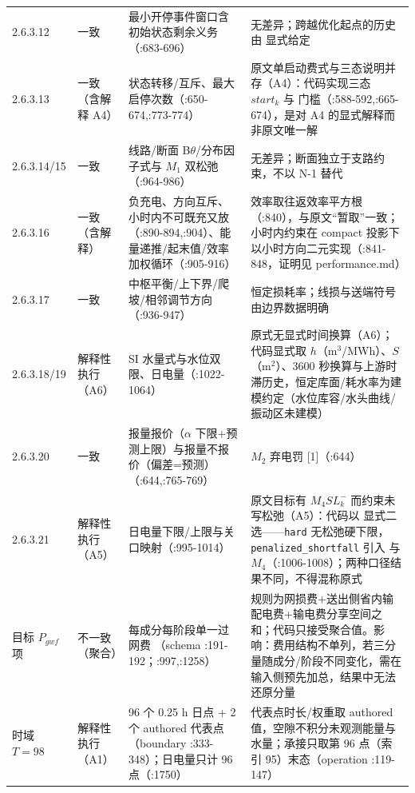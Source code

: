 \begin{center}
\begin{longtable}{@{}L{1.7cm}L{2.2cm}L{4.6cm}L{6.6cm}@{}}
2.6.3.12 & 一致 & 最小开停事件窗口含初始状态剩余义务（:683-696） & 无差异；跨越优化起点的历史由  显式给定\\
2.6.3.13 & 一致（含解释 A4） & 状态转移/互斥、最大启停次数（:650-674,:773-774） & 原文单启动费式与三态说明并存（A4）：代码实现三态 $start_k$ 与  门槛（:588-592,:665-674），是对 A4 的显式解释而非原文唯一解\\
2.6.3.14/15 & 一致 & 线路/断面 B$\theta$/分布因子式与 $M_1$ 双松弛（:964-986） & 无差异；断面独立于支路约束，不以 N-1 替代\\
2.6.3.16 & 一致（含解释） & 负充电、方向互斥、小时内不可既充又放（:890-894,:904）、能量递推/起末值/效率加权循环（:905-916） & 效率取往返效率平方根（:840），与原文“暂取”一致；小时内约束在 compact 投影下以小时方向二元实现（:841-848，证明见 performance.md）\\
2.6.3.17 & 一致 & 中枢平衡/上下界/爬坡/相邻调节方向（:936-947） & 恒定损耗率；线损与送端符号由边界数据明确\\
2.6.3.18/19 & 解释性执行（A6） & SI 水量式与水位双限、日电量（:1022-1064） & 原式无显式时间换算（A6）；代码显式取 $h$（m$^3$/MWh）、$S$（m$^2$）、3600 秒换算与上游时滞历史，恒定库面/耗水率为建模约定（水位库容/水头曲线/振动区未建模）\\
2.6.3.20 & 一致 & 报量报价（$\alpha$ 下限+预测上限）与报量不报价（偏差=预测）（:644,:765-769） & $M_2$ 弃电罚 [1]（:644）\\
2.6.3.21 & 解释性执行（A5） & 日电量下限/上限与关口映射（:995-1014） & 原文目标有 $M_4SL_k^-$ 而约束未写松弛（A5）：代码以  显式二选——\texttt{hard} 无松弛硬下限，\texttt{penalized\_shortfall} 引入  与 $M_4$（:1006-1008）；两种口径结果不同，不得混称原式\\
目标 $P_{gwf}$ 项 & 不一致（聚合） & 每成分每阶段单一过网费 （schema :191-192；:997,:1258） & 规则为网损费+送出侧省内输配电费+输电费分享空间之和；代码只接受聚合值。影响：费用结构不单列，若三分量随成分/阶段不同变化，需在输入侧预先加总，结果中无法还原分量\\
时域 $T=98$ & 解释性执行（A1） & 96 个 0.25 h 日点 + 2 个 authored 代表点（boundary :333-348）；日电量只计 96 点（:1750） & 代表点时长/权重取 authored 值，空隙不积分未观测能量与水量；承接只取第 96 点（索引 95）末态（operation :119-147）\\
\bottomrule
\end{longtable}
\end{center}

